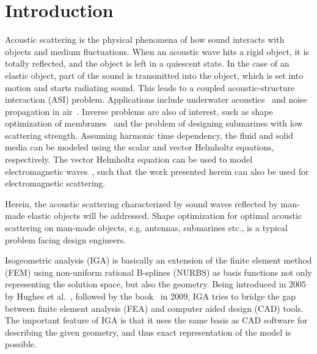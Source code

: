 \section{Introduction}
Acoustic scattering is the physical phenomena of how sound interacts with objects and medium fluctuations. When an acoustic wave hits a rigid object, it is totally reflected, and the object is left in a quiescent state. In the case of an elastic object, part of the sound is transmitted into the object, which is set into motion and starts radiating sound. This leads to a coupled acoustic-structure interaction (ASI) problem.
Applications include underwater acoustics~\cite{Gilroy2013bib} and noise propagation in air~\cite{Bouillard1999eea}. Inverse problems are also of interest, such as shape optimization of membranes~\cite{Manh2011iso} and the problem of designing submarines with low scattering strength. Assuming harmonic time dependency, the fluid and solid media can be modeled using the scalar and vector Helmholtz equations, respectively. The vector Helmholtz equation can be used to model electromagnetic waves~\cite{Manh2012iaa}, such that the work presented herein can also be used for electromagnetic scattering.

Herein, the acoustic scattering characterized by sound waves reflected by man-made elastic objects will be addressed. Shape optimization for optimal acoustic scattering on man-made objects, e.g. antennas, submarines etc., is a typical problem facing design engineers.

Isogeometric analysis (IGA) is basically an extension of the finite element method (FEM) using non-uniform rational B-splines (NURBS) as basis functions not only representing the solution space, but also the geometry. Being introduced in 2005 by Hughes et al.~\cite{Hughes2005iac}, followed by the book~\cite{Cottrell2009iat} in 2009, IGA tries to bridge the gap between finite element analysis (FEA) and computer aided design (CAD) tools. The important feature of IGA is that it uses the same basis as CAD software for describing the given geometry, and thus exact representation of the model is possible.

